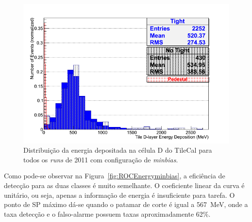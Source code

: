 \begin{figure}[htpb!]
    \centering
    \includegraphics[width=12cm]{images/minbias/histEnergyDeposition.png}
    \caption{Distribuição da energia depositada na célula D do TileCal para
    todos os \emph{runs} de 2011 com configuração de \emph{minbias}.}
    \label{fig:histEnergyminbias}
\end{figure}


Como pode-se observar na Figura~\ref{fig:ROCEnergyminbias}, a eficiência de
detecção para as duas classes é muito semelhante. O coeficiente linear da curva
é unitário, ou seja, apenas a informação de energia é insuficiente para tarefa.
O ponto de SP máximo dá-se quando o patamar de corte é igual a 567~MeV, onde a
taxa detecção e o falso-alarme possuem taxas  aproximadamente 62\%.

